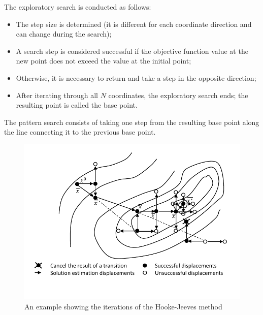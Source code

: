 \documentclass[runningheads]{llncs}
\begin{document}

The exploratory search is conducted as follows:
\begin{itemize}[label=$\bullet$] 
	\item The step size is determined (it is different for each coordinate direction and can change during the search);
	\item A search step is considered successful if the objective function value at the new point does not exceed the value at the initial point; 
	\item Otherwise, it is necessary to return and take a step in the opposite direction; 
	\item After iterating through all $N$ coordinates, the exploratory search ends; the resulting point is called the base point.
\end{itemize}
The pattern search consists of taking one step from the resulting base point along the line connecting it to the previous base point.



\begin{figure} 
	\begin{center} 
		\begin{minipage}[!h]{1.0\linewidth} 
			\includegraphics[width=1\linewidth]{figure/fig1.pdf} 
			\caption{An example showing the iterations of the Hooke-Jeeves method} %
			\label{fig:fig1} 
		\end{minipage} 
	\end{center} 
\end{figure}	
\end{document}
